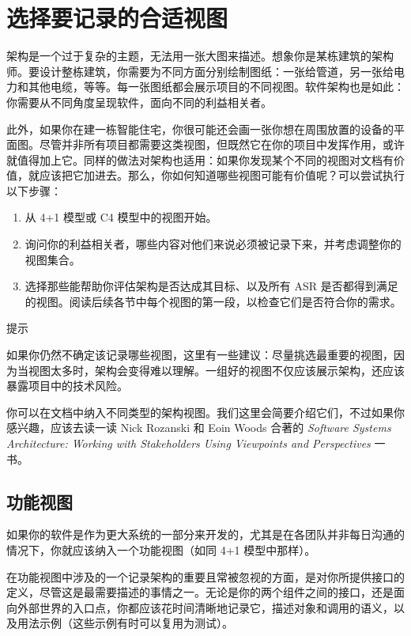 \section{选择要记录的合适视图}

\label{idx:221}
架构是一个过于复杂的主题，无法用一张大图来描述。想象你是某栋建筑的架构师。要设计整栋建筑，你需要为不同方面分别绘制图纸：一张给管道，另一张给电力和其他电缆，等等。每一张图纸都会展示项目的不同视图。软件架构也是如此：你需要从不同角度呈现软件，面向不同的利益相关者。

此外，如果你在建一栋智能住宅，你很可能还会画一张你想在周围放置的设备的平面图。尽管并非所有项目都需要这类视图，但既然它在你的项目中发挥作用，或许就值得加上它。同样的做法对架构也适用：如果你发现某个不同的视图对文档有价值，就应该把它加进去。那么，你如何知道哪些视图可能有价值呢？可以尝试执行以下步骤：

\begin{enumerate}
\item 从 4+1 模型或 C4 模型中的视图开始。
\item 询问你的利益相关者，哪些内容对他们来说必须被记录下来，并考虑调整你的视图集合。
\item 选择那些能帮助你评估架构是否达成其目标、以及所有 ASR 是否都得到满足的视图。阅读后续各节中每个视图的第一段，以检查它们是否符合你的需求。
\end{enumerate}

\begin{myTip}{提示}

如果你仍然不确定该记录哪些视图，这里有一些建议：尽量挑选最重要的视图，因为当视图太多时，架构会变得难以理解。一组好的视图不仅应该展示架构，还应该暴露项目中的技术风险。
\end{myTip}

\label{idx:222}
你可以在文档中纳入不同类型的架构视图。我们这里会简要介绍它们，不过如果你感兴趣，应该去读一读 Nick Rozanski 和 Eoin Woods 合著的 \emph{Software Systems Architecture: Working with Stakeholders Using Viewpoints and Perspectives} 一书。

\subsection{功能视图}

如果你的软件是作为更大系统的一部分来开发的，尤其是在各团队并非每日沟通的情况下，你就应该纳入一个功能视图（如同 4+1 模型中那样）。

\label{idx:223}
\label{idx:224}
在功能视图中涉及的一个记录架构的重要且常被忽视的方面，是对你所提供接口的定义，尽管这是最需要描述的事情之一。无论是你的两个组件之间的接口，还是面向外部世界的入口点，你都应该花时间清晰地记录它，描述对象和调用的语义，以及用法示例（这些示例有时可以复用为测试）。

